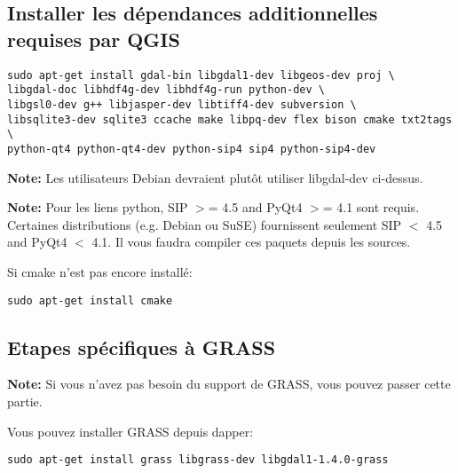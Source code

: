 \subsection{Installer les dépendances additionnelles requises par QGIS}
\begin{verbatim}
sudo apt-get install gdal-bin libgdal1-dev libgeos-dev proj \
libgdal-doc libhdf4g-dev libhdf4g-run python-dev \
libgsl0-dev g++ libjasper-dev libtiff4-dev subversion \
libsqlite3-dev sqlite3 ccache make libpq-dev flex bison cmake txt2tags \
python-qt4 python-qt4-dev python-sip4 sip4 python-sip4-dev
\end{verbatim}

\textbf{Note:} Les utilisateurs Debian devraient plutôt utiliser libgdal-dev ci-dessus.

\textbf{Note:} Pour les liens python, SIP $>$= 4.5 and PyQt4 $>$= 4.1 sont requis. Certaines distributions (e.g. Debian ou SuSE) fournissent seulement SIP $<$ 4.5 and PyQt4 $<$ 4.1. Il vous faudra compiler ces paquets depuis les sources.

Si cmake n'est pas encore installé:

\begin{verbatim}
sudo apt-get install cmake
\end{verbatim}

% 
% 
% 

\subsection{Etapes spécifiques à GRASS}
\textbf{Note:} Si vous n'avez pas besoin du support de GRASS, vous pouvez passer cette partie.

Vous pouvez installer GRASS depuis dapper:

\begin{verbatim}
sudo apt-get install grass libgrass-dev libgdal1-1.4.0-grass 
\end{verbatim}

